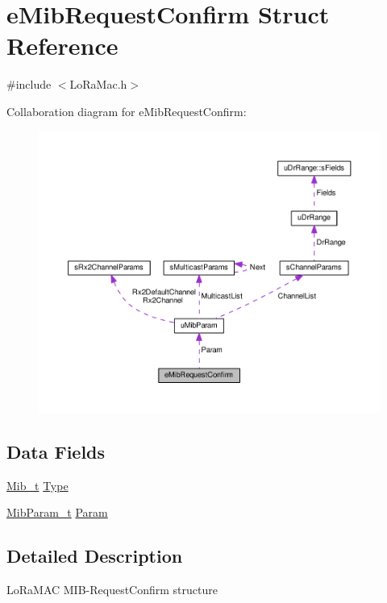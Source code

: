 \hypertarget{structeMibRequestConfirm}{}\section{e\+Mib\+Request\+Confirm Struct Reference}
\label{structeMibRequestConfirm}


{\ttfamily \#include $<$Lo\+Ra\+Mac.\+h$>$}



Collaboration diagram for e\+Mib\+Request\+Confirm\+:
\nopagebreak
\begin{figure}[H]
\begin{center}
\leavevmode
\includegraphics[width=350pt]{structeMibRequestConfirm__coll__graph}
\end{center}
\end{figure}
\subsection*{Data Fields}
\begin{DoxyCompactItemize}
\item 
\hyperlink{group__LORAMAC_gaf17bd3de9ec75e4954be9a070cd8ddf9}{Mib\+\_\+t} \hyperlink{structeMibRequestConfirm_ad3d963c102bbd81f7dd9918f4c1731c1}{Type}
\item 
\hyperlink{group__LORAMAC_gae9f2411f44447849f5b36bcaca1feb5c}{Mib\+Param\+\_\+t} \hyperlink{structeMibRequestConfirm_a71cc0adf3fe8337eaa6dc69a1463c8bc}{Param}
\end{DoxyCompactItemize}


\subsection{Detailed Description}
Lo\+Ra\+M\+AC M\+I\+B-\/\+Request\+Confirm structure 

